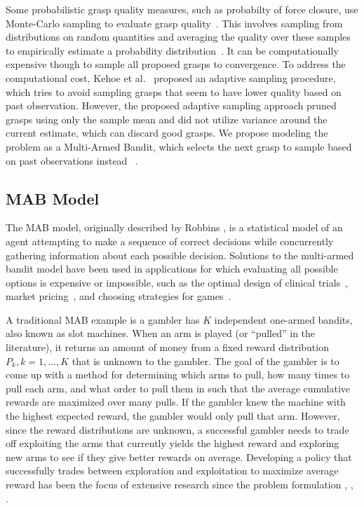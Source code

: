 \documentclass[10pt, conference]{ieeeconf}      %
\begin{document}
Some probabilistic grasp quality measures, such as probabilty of force closure, use Monte-Carlo sampling to evaluate grasp quality~\cite{christopoulos2007handling, kehoe2012estimating, kehoe2012toward}.
This involves sampling from distributions on random quantities and averaging the quality over these samples to empirically estimate a probability distribution~\cite{caflisch1998monte}.
It can be computationally expensive though to sample all proposed grasps to convergence.
To address the computational cost, Kehoe et al.~\cite{kehoe2012estimating} proposed an adaptive sampling procedure, which tries to avoid sampling grasps that seem to have lower quality based on past observation. 
However, the proposed adaptive sampling approach pruned grasps using only the sample mean and did not utilize variance around the current estimate, which can discard good grasps.
We propose modeling the problem as a Multi-Armed Bandit, which selects the next grasp to sample based on past observations instead ~\cite{barto1998reinforcement, lai1985asymptotically}.

\subsection{MAB Model}
The MAB model, originally described by Robbins \cite{robbins1985some}, is a statistical model of an agent attempting to make a sequence of correct decisions while concurrently gathering information about each possible decision. Solutions to the multi-armed bandit model have been used in applications for which evaluating all possible options is expensive or impossible, such as the optimal design of clinical trials~\cite{simon1989optimal}, market pricing~\cite{rothschild1974two}, and choosing strategies for games~\cite{st2012online}. 

A traditional MAB example is a gambler has $K$ independent one-armed bandits, also known as slot machines.
When an arm is played (or ``pulled'' in the literature), it returns an amount of money from a fixed reward distribution $P_k, k = 1, ..., K$ that is unknown to the gambler.
The goal of the gambler is to come up with a method for determining which arms to pull, how many times to pull each arm, and what order to pull them in such that the average cumulative rewards are maximized over many pulls.
If the gambler knew the machine with the highest expected reward, the gambler would only pull that arm.
However, since the reward distributions are unknown, a successful gambler needs to trade off exploiting the arms that currently yields the highest reward and exploring new arms to see if they give better rewards on average.
Developing a policy that successfully trades between exploration and exploitation to maximize average reward has been the focus of extensive research since the problem formulation \cite{bubeck2009pure}, \cite{robbins1985some}, \cite{bergemann2006bandit}.
\end{document}
